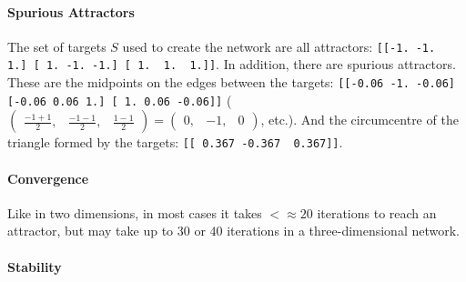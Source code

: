 \paragraph{Spurious Attractors}

The set of targets $S$ used to create the network are all attractors:
\verb|[[-1. -1.  1.] [ 1. -1. -1.] [ 1.  1.  1.]]|.
In addition, there are spurious attractors.
These are the midpoints on the edges between the targets:
\verb|[[-0.06 -1. -0.06]| \verb|[-0.06 0.06 1.] [ 1. 0.06 -0.06]]|
\big($\begin{pmatrix}
    \frac{-1 + 1}{2}, & \frac{-1 - 1}{2}, & \frac{1 - 1}{2}
\end{pmatrix} = \begin{pmatrix}
    0, & -1, & 0
\end{pmatrix}$, etc.\big).
And the circumcentre of the triangle formed by the targets:
\verb|[[ 0.367 -0.367  0.367]]|.

\paragraph{Convergence} Like in two dimensions, in most cases it takes $< \approx 20$ iterations to reach an attractor,
but may take up to $30$ or $40$ iterations in a three-dimensional network.

\paragraph{Stability}

